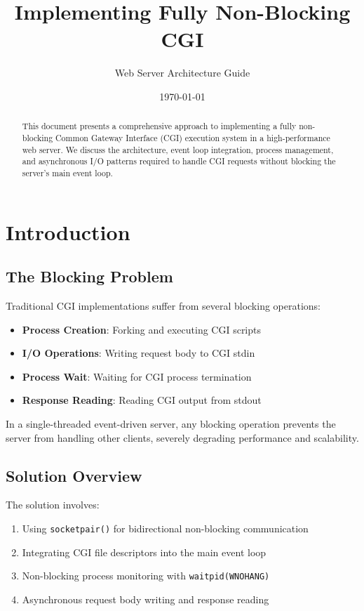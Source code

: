 \documentclass[12pt,a4paper]{article}
\title{\textbf{Implementing Fully Non-Blocking CGI}}
\author{Web Server Architecture Guide}
\date{\today}
\begin{document}
\maketitle

\begin{abstract}
This document presents a comprehensive approach to implementing a fully non-blocking Common Gateway Interface (CGI) execution system in a high-performance web server. We discuss the architecture, event loop integration, process management, and asynchronous I/O patterns required to handle CGI requests without blocking the server's main event loop.
\end{abstract}

\tableofcontents
\newpage

\section{Introduction}

\subsection{The Blocking Problem}

Traditional CGI implementations suffer from several blocking operations:
\begin{itemize}
    \item \textbf{Process Creation}: Forking and executing CGI scripts
    \item \textbf{I/O Operations}: Writing request body to CGI stdin
    \item \textbf{Process Wait}: Waiting for CGI process termination
    \item \textbf{Response Reading}: Reading CGI output from stdout
\end{itemize}

In a single-threaded event-driven server, any blocking operation prevents the server from handling other clients, severely degrading performance and scalability.

\subsection{Solution Overview}

The solution involves:
\begin{enumerate}
    \item Using \texttt{socketpair()} for bidirectional non-blocking communication
    \item Integrating CGI file descriptors into the main event loop
    \item Non-blocking process monitoring with \texttt{waitpid(WNOHANG)}
    \item Asynchronous request body writing and response reading
\end{enumerate}
\end{document}
